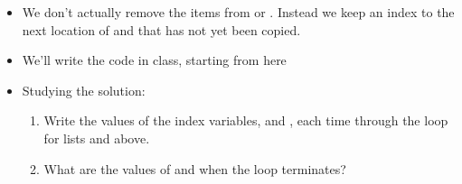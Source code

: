 \documentclass[letterpaper,10pt,english]{sphinxmanual}
\begin{document}
\begin{itemize}
\begin{itemize}
\end{itemize}

\item {} 
We don’t actually remove the items from  or . Instead we
keep an index to the next location of  and  that has not
yet been copied.

\item {} 
We’ll write the code in class, starting from here

%
\begin{sphinxVerbatim}[commandchars=\\\{\}]
  
      
      
      \PYG{p}{[}\PYG{p}{]}












     
\end{sphinxVerbatim}

\item {} 
Studying the solution:
\begin{enumerate}
\item {} 
Write the values of the index variables,  and , each
time through the loop for lists  and  above.

\item {} 
What are the values of  and  when the loop terminates?

\end{enumerate}

\end{itemize}
\end{document}
